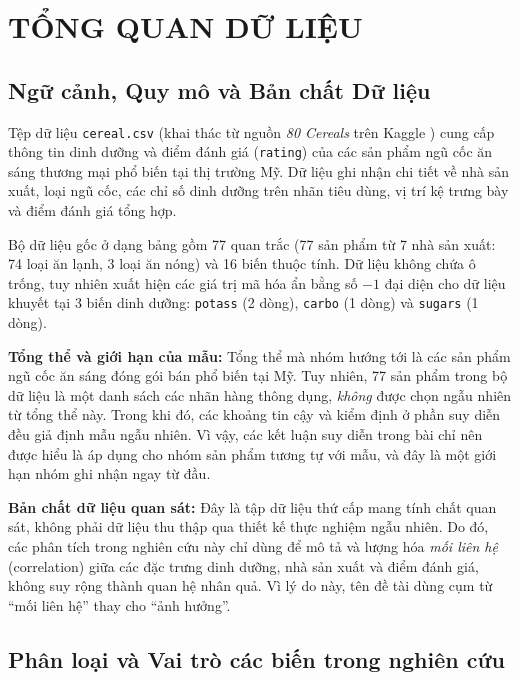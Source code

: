 \documentclass[12pt,a4paper]{article}
\begin{document}
\section{TỔNG QUAN DỮ LIỆU}

\subsection{Ngữ cảnh, Quy mô và Bản chất Dữ liệu}

Tệp dữ liệu \texttt{cereal.csv} (khai thác từ nguồn \textit{80 Cereals} trên Kaggle
\cite{kaggle}) cung cấp thông tin dinh dưỡng và điểm đánh giá (\texttt{rating}) của các sản
phẩm ngũ cốc ăn sáng thương mại phổ biến tại thị trường Mỹ. Dữ liệu ghi nhận chi tiết về nhà
sản xuất, loại ngũ cốc, các chỉ số dinh dưỡng trên nhãn tiêu dùng, vị trí kệ trưng bày và
điểm đánh giá tổng hợp.

Bộ dữ liệu gốc ở dạng bảng gồm 77 quan trắc (77 sản phẩm từ 7 nhà sản xuất: 74 loại ăn lạnh,
3 loại ăn nóng) và 16 biến thuộc tính. Dữ liệu không chứa ô trống, tuy nhiên xuất hiện các
giá trị mã hóa ẩn bằng số $-1$ đại diện cho dữ liệu khuyết tại 3 biến dinh dưỡng:
\texttt{potass} (2 dòng), \texttt{carbo} (1 dòng) và \texttt{sugars} (1 dòng).

\textbf{Tổng thể và giới hạn của mẫu:} Tổng thể mà nhóm hướng tới là các sản phẩm ngũ cốc ăn
sáng đóng gói bán phổ biến tại Mỹ. Tuy nhiên, 77 sản phẩm trong bộ dữ liệu là một danh sách
các nhãn hàng thông dụng, \emph{không} được chọn ngẫu nhiên từ tổng thể này. Trong khi đó, các
khoảng tin cậy và kiểm định ở phần suy diễn đều giả định mẫu ngẫu nhiên. Vì vậy, các kết luận
suy diễn trong bài chỉ nên được hiểu là áp dụng cho nhóm sản phẩm tương tự với mẫu, và đây là
một giới hạn nhóm ghi nhận ngay từ đầu.

\textbf{Bản chất dữ liệu quan sát:} Đây là tập dữ liệu thứ cấp mang tính chất quan sát, không
phải dữ liệu thu thập qua thiết kế thực nghiệm ngẫu nhiên. Do đó, các phân tích trong nghiên
cứu này chỉ dùng để mô tả và lượng hóa \emph{mối liên hệ} (correlation) giữa các đặc trưng
dinh dưỡng, nhà sản xuất và điểm đánh giá, không suy rộng thành quan hệ nhân quả. Vì lý do
này, tên đề tài dùng cụm từ ``mối liên hệ'' thay cho ``ảnh hưởng''.

\subsection{Phân loại và Vai trò các biến trong nghiên cứu}
\end{document}
